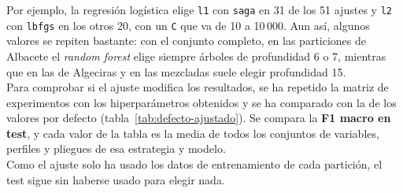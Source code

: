 Por ejemplo, la regresión logística elige \texttt{l1} con \texttt{saga} en 31 de los 51 ajustes y \texttt{l2} con \texttt{lbfgs} en los otros 20, con un \texttt{C} que va de 10 a 10\,000. Aun así, algunos valores se repiten bastante: con el conjunto completo, en las particiones de Albacete el \textit{random forest} elige siempre árboles de profundidad 6 o 7, mientras que en las de Algeciras y en las mezcladas suele elegir profundidad 15.
\\

Para comprobar si el ajuste modifica los resultados, se ha repetido la matriz de experimentos con los hiperparámetros obtenidos y se ha comparado con la de los valores por defecto (tabla~\ref{tab:defecto-ajustado}). Se compara la \textbf{F1 macro en test}, y cada valor de la tabla es la media de todos los conjuntos de variables, perfiles y pliegues de esa estrategia y modelo.
\\

Como el ajuste solo ha usado los datos de entrenamiento de cada partición, el test sigue sin haberse usado para elegir nada.
\\

